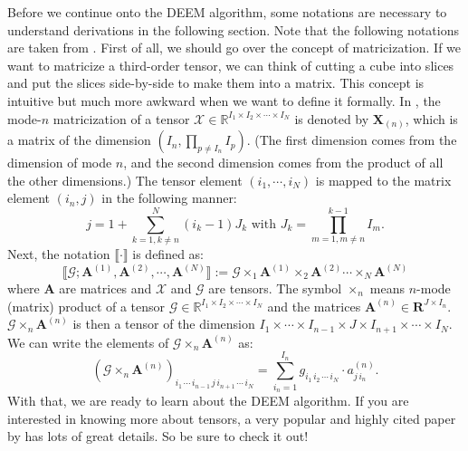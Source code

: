 \documentclass[11pt]{article}
\begin{document}
Before we continue onto the DEEM algorithm, some notations are necessary to understand derivations in the following section. Note that the following notations are taken from \cite{kolda2009review}. First of all, we should go over the concept of matricization. If we want to matricize a third-order tensor, we can think of cutting a cube into slices and put the slices side-by-side to make them into a matrix. This concept is intuitive but much more awkward when we want to define it formally. In \cite{kolda2009review}, the mode-$n$ matricization of a tensor $\mathcal{X} \in \mathbb{R}^{I_1 \times I_2 \times \cdots \times I_N}$ is denoted by $\mathbf{X}_{(n)}$, which is a matrix of the dimension $(I_n, \prod_{p \ne I_n} I_p)$. (The first dimension comes from the dimension of mode $n$, and the second dimension comes from the product of all the other dimensions.) The tensor element $(i_1, \cdots, i_N)$ is mapped to the matrix element $(i_n, j)$ in the following manner: 
\begin{equation*}
    j = 1 + \sum_{k=1,k\ne n}^N (i_k - 1) J_k \text{ with } J_k = \prod_{m=1,m \ne n}^{k-1} I_m.
\end{equation*}
Next, the notation $\llbracket \cdot \rrbracket$ is defined as: 
\begin{equation*}
    \llbracket \mathcal{G}; \mathbf{A}^{(1)}, \mathbf{A}^{(2)}, \cdots, \mathbf{A}^{(N)} \rrbracket := \mathcal{G} \times_1 \mathbf{A}^{(1)} \times_2 \mathbf{A}^{(2)} 
    \cdots 
    \times_N \mathbf{A}^{(N)}
\end{equation*}
where $\mathbf{A}$ are matrices and $\mathcal{X}$ and $\mathcal{G}$ are tensors. The symbol $\times_n$ means $n$-mode (matrix) product of a tensor $\mathcal{G} \in \mathbb{R}^{I_1 \times I_2 \times \cdots \times I_N}$ and the matrices $\mathbf{A}^{(n)} \in \mathbf{R}^{J \times I_n}$. $\mathcal{G} \times_n \mathbf{A}^{(n)}$ is then a tensor of the dimension $I_1 \times \cdots \times I_{n-1} \times J \times I_{n+1} \times \cdots \times I_N$. We can write the elements of $\mathcal{G} \times_n \mathbf{A}^{(n)}$ as:
\begin{equation*}
    (\mathcal{G} \times_n \mathbf{A}^{(n)})_{i_1 \, \cdots \, i_{n-1} \, j  \, i_{n+1} \, \cdots \, i_N} = \sum_{i_n = 1}^{I_n} g_{i_1 \, i_2 \, \cdots \, i_N} \cdot a^{(n)}_{j\, i_n}.  
\end{equation*}
With that, we are ready to learn about the DEEM algorithm. If you are interested in knowing more about tensors, a very popular and highly cited paper by \cite{kolda2009review} has lots of great details. So be sure to check it out! 
\end{document}
